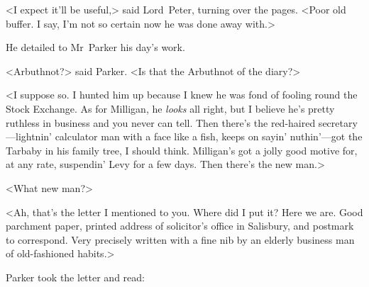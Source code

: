<I expect it'll be useful,> said Lord~Peter, turning over the pages. <Poor old buffer. I say, I'm not so certain now he was done away with.>

He detailed to Mr~Parker his day's work.

<Arbuthnot?> said Parker. <Is that the Arbuthnot of the diary?>

<I suppose so. I hunted him up because I knew he was fond of fooling round the Stock Exchange. As for Milligan, he \textit{looks} all right, but I believe he's pretty ruthless in business and you never can tell. Then there's the red-haired secretary—lightnin' calculator man with a face like a fish, keeps on sayin' nuthin'—got the Tarbaby in his family tree, I should think. Milligan's got a jolly good motive for, at any rate, suspendin' Levy for a few days. Then there's the new man.>

<What new man?>

<Ah, that's the letter I mentioned to you. Where did I put it? Here we are. Good parchment paper, printed address of solicitor's office in Salisbury, and postmark to correspond. Very precisely written with a fine nib by an elderly business man of old-fashioned habits.>

Parker took the letter and read:

\begin{a4}
	\clearpage
\end{a4}


